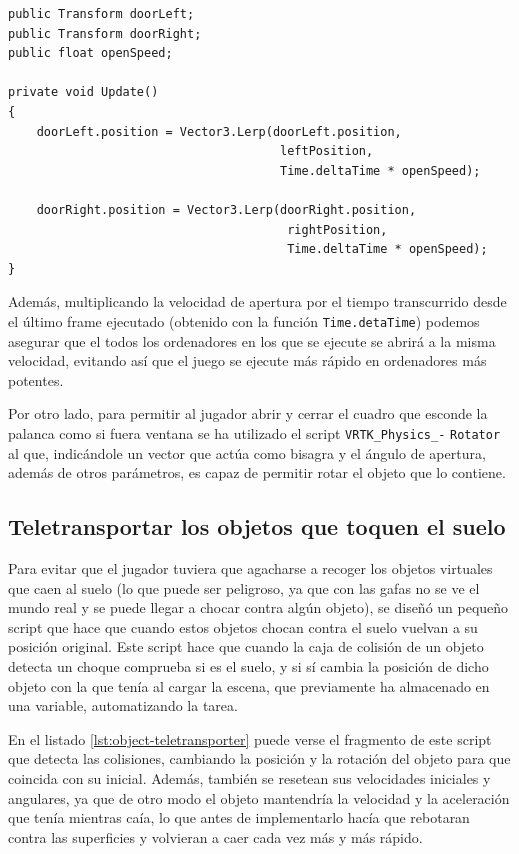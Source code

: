 \begin{lstlisting}[caption=Fragmento del script para abrir y cerrar una puerta abatible con una palanca, label=lst:lever-controller]
public Transform doorLeft;
public Transform doorRight;
public float openSpeed;

private void Update()
{
    doorLeft.position = Vector3.Lerp(doorLeft.position,
                                      leftPosition,
                                      Time.deltaTime * openSpeed);
    
    doorRight.position = Vector3.Lerp(doorRight.position,
                                       rightPosition,
                                       Time.deltaTime * openSpeed);
}
\end{lstlisting}

Además, multiplicando la velocidad de apertura por el tiempo transcurrido desde el último frame ejecutado (obtenido con la función \texttt{Time.detaTime}) podemos asegurar que el todos los ordenadores en los que se ejecute se abrirá a la misma velocidad, evitando así que el juego se ejecute más rápido en ordenadores más potentes.

Por otro lado, para permitir al jugador abrir y cerrar el cuadro que esconde la palanca como si fuera ventana se ha utilizado el script \texttt{VRTK\_Physics\_-} \texttt{Rotator} al que, indicándole un vector que actúa como bisagra y el ángulo de apertura, además de otros parámetros, es capaz de permitir rotar el objeto que lo contiene.

\subsection{Teletransportar los objetos que toquen el suelo}

Para evitar que el jugador tuviera que agacharse a recoger los objetos virtuales que caen al suelo (lo que puede ser peligroso, ya que con las gafas no se ve el mundo real y se puede llegar a chocar contra algún objeto), se diseñó un pequeño script que hace que cuando estos objetos chocan contra el suelo vuelvan a su posición original. Este script hace que cuando la caja de colisión de un objeto detecta un choque comprueba si es el suelo, y si sí cambia la posición de dicho objeto con la que tenía al cargar la escena, que previamente ha almacenado en una variable, automatizando la tarea.

En el listado \ref{lst:object-teletransporter} puede verse el fragmento de este script que detecta las colisiones, cambiando la posición y la rotación del objeto para que coincida con su inicial. Además, también se resetean sus velocidades iniciales y angulares, ya que de otro modo el objeto mantendría la velocidad y la aceleración que tenía mientras caía, lo que antes de implementarlo hacía que rebotaran contra las superficies y volvieran a caer cada vez más y más rápido.

